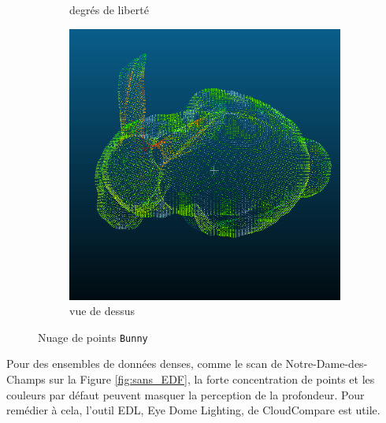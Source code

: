 \documentclass[../5RO17_TP4.tex]{subfiles}
\begin{document}
\begin{figure}[H]
\begin{subfigure}[b]{0.325\textwidth}
        \caption{degrés de liberté}
        \label{}
    \end{subfigure}\hfill
    \begin{subfigure}[b]{0.325\textwidth}
        \centering
        \includegraphics[width=\linewidth]{images/bunny_up.png}
        \caption{vue de dessus}
        \label{}
    \end{subfigure}
    \caption{Nuage de points \texttt{Bunny}}
    \label{}
\end{figure}
\noindent Pour des ensembles de données denses, comme le scan de Notre-Dame-des-Champs sur la Figure \ref{fig:sans_EDF}, la forte concentration de points et les couleurs par défaut peuvent masquer la perception de la profondeur. Pour remédier à cela, l'outil EDL, Eye Dome Lighting, de CloudCompare est utile.\\
\end{document}
